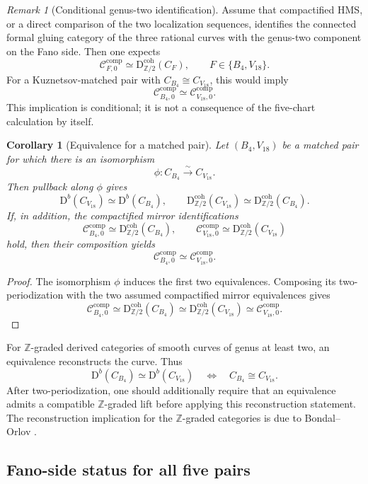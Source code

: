 \documentclass[11pt]{amsart}
\newtheorem{corollary}[theorem]{Corollary}
\theoremstyle{definition}
\theoremstyle{remark}
\newtheorem{remark}[theorem]{Remark}
\newcommand{\Db}{\mathrm D^{b}}
\newcommand{\Dtwo}{\mathrm{D}^{\mathrm{coh}}_{\mathbb Z/2}}
\newcommand{\CcompB}{\mathcal C^{\mathrm{comp}}_{B_4,0}}
\newcommand{\CcompV}{\mathcal C^{\mathrm{comp}}_{V_{18},0}}
\begin{document}
\begin{remark}[Conditional genus-two identification]
Assume that compactified HMS, or a direct comparison of the two localization
sequences, identifies the connected formal gluing category of the three
rational curves with the genus-two component on the Fano side.  Then one
expects
\[
\mathcal C^{\mathrm{comp}}_{F,0}
\simeq
\Dtwo(C_F),
\qquad F\in\{B_4,V_{18}\}.
\]
For a Kuznetsov-matched pair with
$C_{B_4}\cong C_{V_{18}}$, this would imply
\[
\CcompB\simeq\CcompV.
\]
This implication is conditional; it is not a consequence of the five-chart
calculation by itself.
\end{remark}

\begin{corollary}[Equivalence for a matched pair]
\label{cor:matched_pair_equivalence}
Let $(B_4,V_{18})$ be a matched pair for which there is an isomorphism
\[
\phi:C_{B_4}\xrightarrow{\sim}C_{V_{18}}.
\]
Then pullback along $\phi$ gives
\[
\Db(C_{V_{18}})\simeq\Db(C_{B_4}),
\qquad
\Dtwo(C_{V_{18}})\simeq\Dtwo(C_{B_4}).
\]
If, in addition, the compactified mirror identifications
\[
\CcompB\simeq\Dtwo(C_{B_4}),
\qquad
\CcompV\simeq\Dtwo(C_{V_{18}})
\]
hold, then their composition yields
\begin{equation}
\label{eq:matched_compactified_equivalence}
\boxed{\CcompB\simeq\CcompV}.
\end{equation}
\end{corollary}

\begin{proof}
The isomorphism $\phi$ induces the first two equivalences.  Composing its
two-periodization with the two assumed compactified mirror equivalences gives
\[
\CcompB
\simeq\Dtwo(C_{B_4})
\simeq\Dtwo(C_{V_{18}})
\simeq\CcompV.
\]
\end{proof}

For $\mathbb Z$-graded derived categories of smooth curves of genus at least
two, an equivalence reconstructs the curve.  Thus
\[
\Db(C_{B_4})\simeq\Db(C_{V_{18}})
\quad\Longleftrightarrow\quad
C_{B_4}\cong C_{V_{18}}.
\]
After two-periodization, one should additionally require that an equivalence
admits a compatible $\mathbb Z$-graded lift before applying this reconstruction
statement.
The reconstruction implication for the $\mathbb Z$-graded categories is due
to Bondal--Orlov \cite{BondalOrlov}.

\subsection{Fano-side status for all five pairs}
\end{document}
